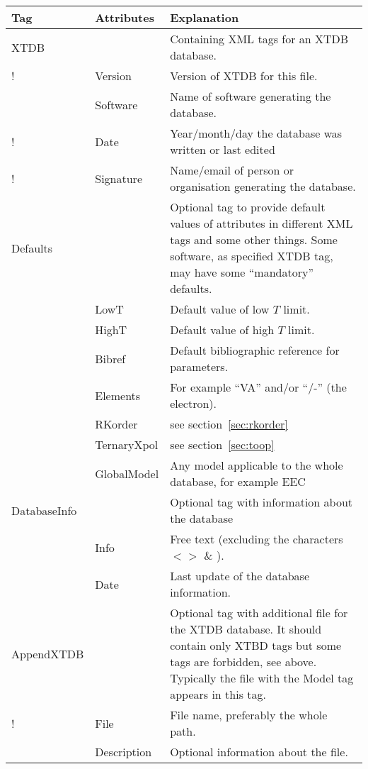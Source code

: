 \documentclass{article}
\begin{document}
\begin{tabular}{|p{} p{} p{}|}\hline
  Tag & Attributes & Explanation\\\hline

  XTDB    &         & Containing XML tags for an XTDB database.\\
!          & Version & Version of XTDB for this file.\\
           &Software & Name of software generating the database.\\
!          &Date     & Year/month/day the database was written or last edited\\
!          &Signature & Name/email of person or organisation generating the database.\\\hline
  
  Defaults & & Optional tag to provide default values of attributes in
  different XML tags and some other things.  Some software, as
  specified XTDB tag,  may have some ``mandatory'' defaults.\\
           & LowT & Default value of low $T$ limit.\\
           & HighT & Default value of high $T$ limit.\\
           & Bibref & Default bibliographic reference for parameters. \\
           & Elements & For example ``VA'' and/or ``/-'' (the electron).\\
           & RKorder & see section~\ref{sec:rkorder} \\
           & TernaryXpol & see section~\ref{sec:toop} \\
           & GlobalModel & Any model applicable to the whole database,
                 for example EEC~\cite{21Sun}\\\hline

  DatabaseInfo & & Optional tag with information about the database\\
           & Info & Free text (excluding the characters $< >$ \& ).\\
           & Date & Last update of the database information.\\\hline

  AppendXTDB & & Optional tag with additional file for the XTDB database.  
              It should contain only XTBD tags but some tags are forbidden,
              see above.  Typically the file with the Model tag appears
              in this tag.\\
!             & File & File name, preferably the whole path.\\
              & Description & Optional information about the file.\\\hline
\end{tabular}
\end{document}
